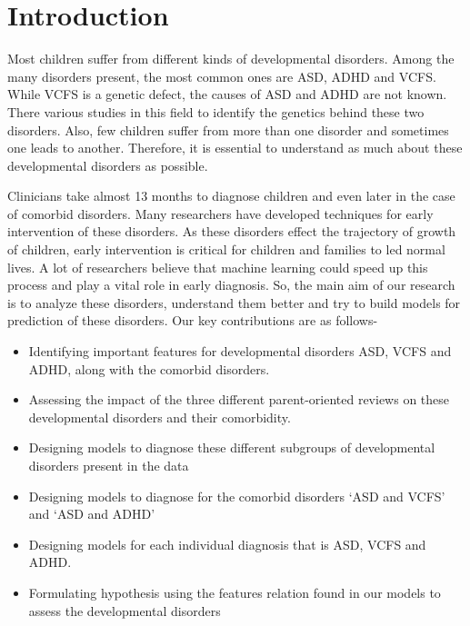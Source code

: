 \chapter{Introduction}
\thispagestyle{plainbottom}
Most children suffer from different kinds of developmental disorders. Among the many disorders present, the most common ones are ASD, ADHD and VCFS. While VCFS is a genetic defect, the causes of ASD and ADHD are not known. There various studies in this field to identify the genetics behind these two disorders. Also, few children suffer from more than one disorder and sometimes one leads to another. Therefore, it is essential to understand as much about these developmental disorders as possible.

Clinicians take almost 13 months to diagnose children and even later in the case of comorbid disorders. Many researchers have developed techniques for early intervention of these disorders. As these disorders effect the trajectory of growth of children, early intervention is critical for children and families to led normal lives. A lot of researchers believe that machine learning could speed up this process and play a vital role in early diagnosis. So, the main aim of our research is to analyze these disorders, understand them better and try to build models for prediction of these disorders. Our key contributions are as follows-
\begin{itemize}
\item Identifying important features for developmental disorders ASD, VCFS and ADHD, along with the comorbid disorders.
\item Assessing the impact of the three different parent-oriented reviews on these developmental disorders and their comorbidity.
\item Designing models to diagnose these different subgroups of developmental disorders present in the data
\item Designing models to diagnose for the comorbid disorders `ASD and VCFS' and `ASD and ADHD'
\item Designing models for each individual diagnosis that is ASD, VCFS and ADHD.
\item Formulating hypothesis using the features relation found in our models to assess the developmental disorders
\end{itemize}


